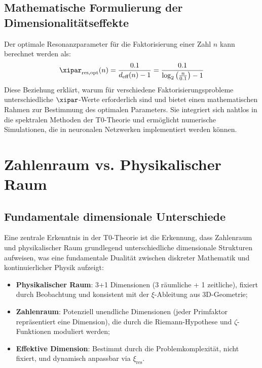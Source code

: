 \subsection{Mathematische Formulierung der Dimensionalitätseffekte}
\label{subsec:mathematical_formulation}
Der optimale Resonanzparameter für die Faktorisierung einer Zahl $n$ kann berechnet werden als:
\begin{equation}
	\xipar_{\text{res,opt}}(n) = \frac{0.1}{d_{\text{eff}}(n)-1} = \frac{0.1}{\log_2\left(\frac{n}{0.1}\right)-1}
\end{equation}
Diese Beziehung erklärt, warum für verschiedene Faktorisierungsprobleme unterschiedliche $\xipar$-Werte erforderlich sind und bietet einen mathematischen Rahmen zur Bestimmung des optimalen Parameters. Sie integriert sich nahtlos in die spektralen Methoden der T0-Theorie und ermöglicht numerische Simulationen, die in neuronalen Netzwerken implementiert werden können.
\section{Zahlenraum vs. Physikalischer Raum}
\label{sec:number_physical_space}
\subsection{Fundamentale dimensionale Unterschiede}
\label{subsec:dimensional_differences}
Eine zentrale Erkenntnis in der T0-Theorie ist die Erkennung, dass Zahlenraum und physikalischer Raum grundlegend unterschiedliche dimensionale Strukturen aufweisen, was eine fundamentale Dualität zwischen diskreter Mathematik und kontinuierlicher Physik aufzeigt:
\begin{highlight}
	\begin{itemize}
		\item \textbf{Physikalischer Raum}: 3+1 Dimensionen (3 räumliche + 1 zeitliche), fixiert durch Beobachtung und konsistent mit der $\xi$-Ableitung aus 3D-Geometrie;
		\item \textbf{Zahlenraum}: Potenziell unendliche Dimensionen (jeder Primfaktor repräsentiert eine Dimension), die durch die Riemann-Hypothese und $\zeta$-Funktionen moduliert werden;
		\item \textbf{Effektive Dimension}: Bestimmt durch die Problemkomplexität, nicht fixiert, und dynamisch anpassbar via $\xi_{\text{res}}$.
	\end{itemize}
\end{highlight}
